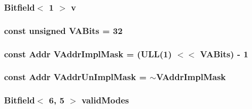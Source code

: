 \label{namespaceMipsISA_afc2b03c55af2f2f9166326e6dc58da97}
\hypertarget{namespaceMipsISA_a4814b685763016f32ad4e56d38a18b5b}{
\subsubsection[{v}]{\setlength{\rightskip}{0pt plus 5cm}Bitfield$<$ 1 $>$ {\bf v}}}
\label{namespaceMipsISA_a4814b685763016f32ad4e56d38a18b5b}
\hypertarget{namespaceMipsISA_a10ace529e46442ee4127c149da6513af}{
\subsubsection[{VABits}]{\setlength{\rightskip}{0pt plus 5cm}const unsigned {\bf VABits} = 32}}
\label{namespaceMipsISA_a10ace529e46442ee4127c149da6513af}
\hypertarget{namespaceMipsISA_ac78d9788b3f9a366df64485c9afaf1b1}{
\subsubsection[{vaddr}]{}}
\label{namespaceMipsISA_ac78d9788b3f9a366df64485c9afaf1b1}
\hypertarget{namespaceMipsISA_a3d31b41fa4d20dbbd91b61d7df201ac9}{
\subsubsection[{VAddrImplMask}]{\setlength{\rightskip}{0pt plus 5cm}const {\bf Addr} {\bf VAddrImplMask} = (ULL(1) $<$$<$ {\bf VABits}) -\/ 1}}
\label{namespaceMipsISA_a3d31b41fa4d20dbbd91b61d7df201ac9}
\hypertarget{namespaceMipsISA_abf1ec857b893186376e563b0da26ec1b}{
\subsubsection[{VAddrUnImplMask}]{\setlength{\rightskip}{0pt plus 5cm}const {\bf Addr} {\bf VAddrUnImplMask} = $\sim${\bf VAddrImplMask}}}
\label{namespaceMipsISA_abf1ec857b893186376e563b0da26ec1b}
\hypertarget{namespaceMipsISA_ad5c29b27e529af3e788395fdaf063787}{
\subsubsection[{validModes}]{\setlength{\rightskip}{0pt plus 5cm}Bitfield$<$ 6, 5 $>$ {\bf validModes}}}
